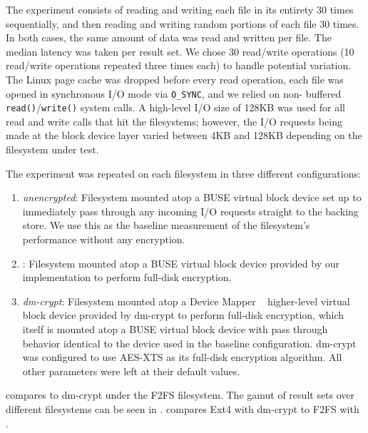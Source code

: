 The experiment consists of reading and writing each file in its entirety 30
times sequentially, and then reading and writing random portions of each file 30
times. In both cases, the same amount of data was read and written per file. The
median latency was taken per result set. We chose 30 read/write operations (10
read/write operations repeated three times each) to handle potential variation.
The Linux page cache was dropped before every read operation, each file was
opened in synchronous I/O mode via \texttt{O\_SYNC}, and we relied on non-
buffered \texttt{read()}/\texttt{write()} system calls. A high-level I/O size of
128KB was used for all read and write calls that hit the filesystems; however,
the I/O requests being made at the block device layer varied between 4KB and
128KB depending on the filesystem under test.

The experiment was repeated on each filesystem in three different
configurations:

\begin{enumerate}
\item \textit{unencrypted}: Filesystem mounted atop a BUSE virtual block
  device set up to immediately pass through any incoming I/O requests straight
  to the backing store. We use this as the baseline measurement of the
  filesystem's performance without any encryption.
\item \textit{\SYSTEM{}}: Filesystem mounted atop a BUSE virtual block
  device provided by our \SYSTEM{} implementation to perform full-disk
  encryption.
\item \textit{dm-crypt}: Filesystem mounted atop a Device Mapper
 ~\cite{LinuxDeviceMapper} higher-level virtual block device provided by
  dm-crypt to perform full-disk encryption, which itself is mounted atop a
  BUSE virtual block device with pass through behavior identical to the device
  used in the baseline configuration. dm-crypt was configured to use AES-XTS as
  its full-disk encryption algorithm. All other parameters were left at their
  default values.
\end{enumerate}

 compares \SYSTEM{} to dm-crypt under the F2FS
filesystem.  The gamut of result sets over different filesystems can
be seen in .  
compares Ext4 with dm-crypt to F2FS with \SYSTEM{}.  

